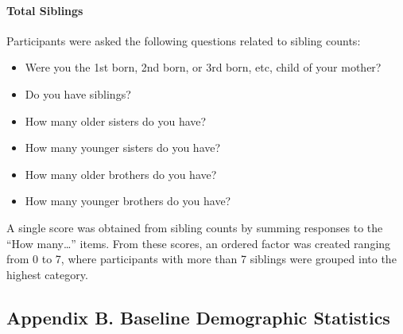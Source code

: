 \documentclass[
  single column]{article}
\let\oldparagraph\paragraph
\renewcommand{\paragraph}[1]{\oldparagraph{#1}\mbox{}}
\providecommand{\tightlist}{%
  \setlength{\itemsep}{0pt}\setlength{\parskip}{0pt}}\usepackage{longtable,booktabs,array}
\begin{document}
\paragraph{Total Siblings}\label{total-siblings}

Participants were asked the following questions related to sibling
counts:

\begin{itemize}
\tightlist
\item
  Were you the 1st born, 2nd born, or 3rd born, etc, child of your
  mother?
\item
  Do you have siblings?
\item
  How many older sisters do you have?
\item
  How many younger sisters do you have?
\item
  How many older brothers do you have?
\item
  How many younger brothers do you have?
\end{itemize}

A single score was obtained from sibling counts by summing responses to
the ``How many\ldots{}'' items. From these scores, an ordered factor was
created ranging from 0 to 7, where participants with more than 7
siblings were grouped into the highest category.

\newpage{}

\subsection{Appendix B. Baseline Demographic
Statistics}\label{appendix-demographics}
\end{document}
